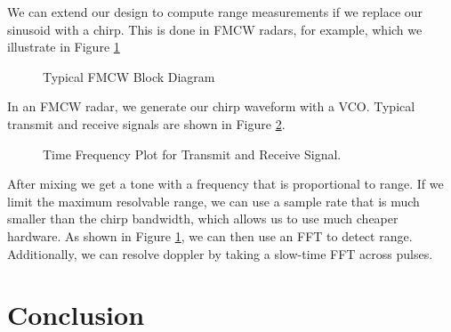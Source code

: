 \documentclass{article}
\begin{document}
We can extend our design to compute range measurements if we replace our sinusoid with a chirp. This is done in FMCW radars, for example, which we illustrate in Figure \ref{fig::fmcw_radar}

\begin{figure}[H]
    	\centering
    	\caption{Typical FMCW Block Diagram \cite{9613183}}
    	\label{fig::fmcw_radar}
\end{figure}
	
\noindent In an FMCW radar, we generate our chirp waveform with a VCO.  Typical transmit and receive signals are shown in Figure \ref{fig::fmcw_spectrogram}.

\begin{figure}[H]
    	\centering
    	\caption{Time Frequency Plot for Transmit and Receive Signal.\cite{Long2019AssistingTV}}
    	\label{fig::fmcw_spectrogram}
\end{figure}

\noindent After mixing we get a tone with a frequency that is proportional to range. If we limit the maximum resolvable range, we can use a sample rate that is much smaller than the chirp bandwidth, which allows us to use much cheaper hardware. As shown in Figure \ref{fig::fmcw_radar}, we can then use an FFT to detect range. Additionally, we can resolve doppler by taking a slow-time FFT across pulses.

\section{Conclusion}


{}
\end{document}
